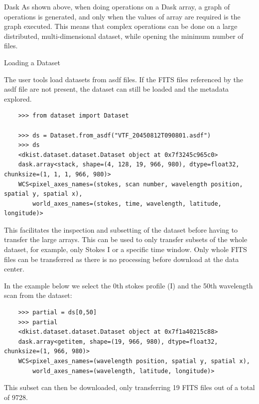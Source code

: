 \documentclass[a0paper,landscape,fontscale=0.3]{baposter}
\begin{document}
\begin{poster}
\begin{posterbox}[name=dask,column=1,row=0,span=1,below=intro]{Dask}
  As shown above, when doing operations on a Dask array, a graph of operations
  is generated, and only when the values of array are required is the graph
  executed. This means that complex operations can be done on a large distributed,
  multi-dimensional dataset, while opening the minimum number of files.

\end{posterbox}
 
\begin{posterbox}[name=dataset,column=2,row=0,span=2]{Loading a Dataset}

  The user tools load datasets from asdf files. If the FITS files referenced
  by the asdf file are not present, the dataset can still be loaded and the
  metadata explored.
 
  \begin{verbatim}
    >>> from dataset import Dataset

    >>> ds = Dataset.from_asdf("VTF_20450812T090801.asdf")
    >>> ds
    <dkist.dataset.dataset.Dataset object at 0x7f3245c965c0>
    dask.array<stack, shape=(4, 128, 19, 966, 980), dtype=float32, chunksize=(1, 1, 1, 966, 980)>
    WCS<pixel_axes_names=(stokes, scan number, wavelength position, spatial y, spatial x),
        world_axes_names=(stokes, time, wavelength, latitude, longitude)>
  \end{verbatim}

  This facilitates the inspection and subsetting of the dataset before having to
  transfer the large arrays. This can be used to only transfer subsets of the
  whole dataset, for example, only Stokes I or a specific time window. Only
  whole FITS files can be transferred as there is no processing before download
  at the data center.

  In the example below we select the 0th stokes profile (I) and the 50th
  wavelength scan from the dataset:
  
\begin{verbatim}
    >>> partial = ds[0,50]
    >>> partial
    <dkist.dataset.dataset.Dataset object at 0x7f1a40215c88>
    dask.array<getitem, shape=(19, 966, 980), dtype=float32, chunksize=(1, 966, 980)>
    WCS<pixel_axes_names=(wavelength position, spatial y, spatial x),
        world_axes_names=(wavelength, latitude, longitude)>
  \end{verbatim}

  This subset can then be downloaded, only transferring 19 FITS files out of a
  total of 9728.


\end{posterbox}
\end{poster}
\end{document}
